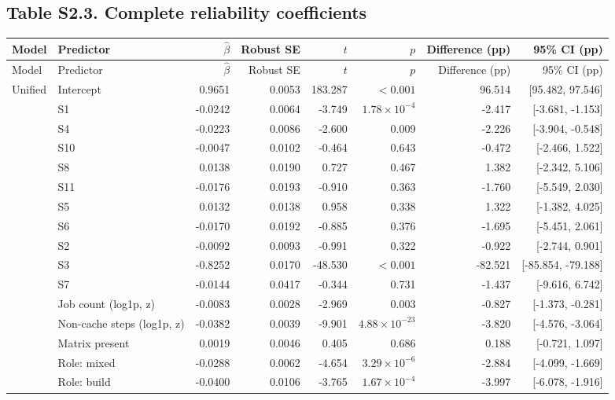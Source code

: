 \documentclass{article}
\begin{document}
\subsection*{Table S2.3. Complete reliability coefficients}
\footnotesize\begin{longtable}{>{\raggedright\arraybackslash}p{2.4cm}>{\raggedright\arraybackslash}p{3.8cm}rrrrrr}
\toprule Model & Predictor & $\hat\beta$ & Robust SE & $t$ & $p$ & Difference (pp) & 95\% CI (pp)\\\midrule\endfirsthead
\toprule Model & Predictor & $\hat\beta$ & Robust SE & $t$ & $p$ & Difference (pp) & 95\% CI (pp)\\\midrule\endhead
Unified & Intercept & 0.9651 & 0.0053 & 183.287 & $<0.001$ & 96.514 & [95.482, 97.546] \\
 & S1 & -0.0242 & 0.0064 & -3.749 & $1.78\times10^{-4}$ & -2.417 & [-3.681, -1.153] \\
 & S4 & -0.0223 & 0.0086 & -2.600 & 0.009 & -2.226 & [-3.904, -0.548] \\
 & S10 & -0.0047 & 0.0102 & -0.464 & 0.643 & -0.472 & [-2.466, 1.522] \\
 & S8 & 0.0138 & 0.0190 & 0.727 & 0.467 & 1.382 & [-2.342, 5.106] \\
 & S11 & -0.0176 & 0.0193 & -0.910 & 0.363 & -1.760 & [-5.549, 2.030] \\
 & S5 & 0.0132 & 0.0138 & 0.958 & 0.338 & 1.322 & [-1.382, 4.025] \\
 & S6 & -0.0170 & 0.0192 & -0.885 & 0.376 & -1.695 & [-5.451, 2.061] \\
 & S2 & -0.0092 & 0.0093 & -0.991 & 0.322 & -0.922 & [-2.744, 0.901] \\
 & S3 & -0.8252 & 0.0170 & -48.530 & $<0.001$ & -82.521 & [-85.854, -79.188] \\
 & S7 & -0.0144 & 0.0417 & -0.344 & 0.731 & -1.437 & [-9.616, 6.742] \\
 & Job count (log1p, z) & -0.0083 & 0.0028 & -2.969 & 0.003 & -0.827 & [-1.373, -0.281] \\
 & Non-cache steps (log1p, z) & -0.0382 & 0.0039 & -9.901 & $4.88\times10^{-23}$ & -3.820 & [-4.576, -3.064] \\
 & Matrix present & 0.0019 & 0.0046 & 0.405 & 0.686 & 0.188 & [-0.721, 1.097] \\
 & Role: mixed & -0.0288 & 0.0062 & -4.654 & $3.29\times10^{-6}$ & -2.884 & [-4.099, -1.669] \\
 & Role: build & -0.0400 & 0.0106 & -3.765 & $1.67\times10^{-4}$ & -3.997 & [-6.078, -1.916] \\

\end{longtable}
\end{document}

